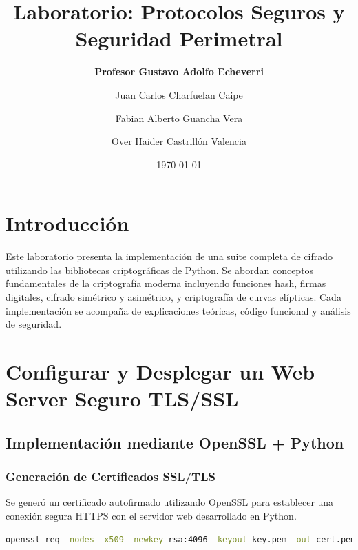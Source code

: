 \documentclass[12pt,a4paper]{article}
\begin{document}
\title{\LARGE \textbf{Laboratorio: Protocolos Seguros y Seguridad Perimetral}}

\author{\textbf{Profesor Gustavo Adolfo Echeverri\\}}
\author[1]{Juan Carlos Charfuelan Caipe}
\author[2]{Fabian Alberto Guancha Vera}
\author[3]{Over Haider Castrillón Valencia}

\date{\today}
\maketitle

\section*{Introducción}
Este laboratorio presenta la implementación de una suite completa de cifrado utilizando las
bibliotecas criptográficas de Python. Se abordan conceptos fundamentales de la criptografía moderna
incluyendo funciones hash, firmas digitales, cifrado simétrico y asimétrico, y criptografía de
curvas elípticas. Cada implementación se acompaña de explicaciones teóricas, código funcional y
análisis de seguridad.

\section{Configurar y Desplegar un Web Server Seguro TLS/SSL}

\subsection{Implementación mediante OpenSSL + Python}

\subsubsection{Generación de Certificados SSL/TLS}

Se generó un certificado autofirmado utilizando OpenSSL para establecer una
conexión segura HTTPS con el servidor web desarrollado en Python.

\begin{lstlisting}[language=bash, caption=Comando para generar certificado autofirmado]
openssl req -nodes -x509 -newkey rsa:4096 -keyout key.pem -out cert.pem -days 365 -subj '/CN=localhost/O=UCM'
\end{lstlisting}
\end{document}

